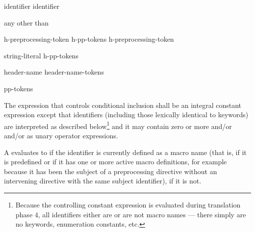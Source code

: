 %
\begin{bnf}
\br
     identifier\br
     identifier \terminal{)}
\end{bnf}

\begin{bnf}
\br
    \textnormal{any  other than \terminal{>}}
\end{bnf}

\begin{bnf}
\br
    h-preprocessing-token\br
    h-pp-tokens h-preprocessing-token
\end{bnf}

\begin{bnf}
\br
    string-literal\br
    \terminal{<} h-pp-tokens \terminal{>}
\end{bnf}

%
\begin{bnf}
\br
     \terminal{(} header-name \terminal{)}\br
     \terminal{(} header-name-tokens \terminal{)}
\end{bnf}

%
\begin{bnf}
\br
     pp-tokens \terminal{)}
\end{bnf}

\pnum
The expression that controls conditional inclusion
shall be an integral constant expression except that
identifiers
(including those lexically identical to keywords)
are interpreted as described below\footnote{Because the controlling constant expression is evaluated
during translation phase 4,
all identifiers either are or are not macro names ---
there simply are no keywords, enumeration constants, etc.}
and it may contain zero or more  and/or
 and/or
 as unary operator expressions.

\pnum
A  evaluates to 
if the identifier is currently defined
as a macro name
(that is, if it is predefined
or if it has one or more active macro definitions,
for example because
it has been the subject of a
preprocessing directive
without an intervening
directive with the same subject identifier),  if it is not.

